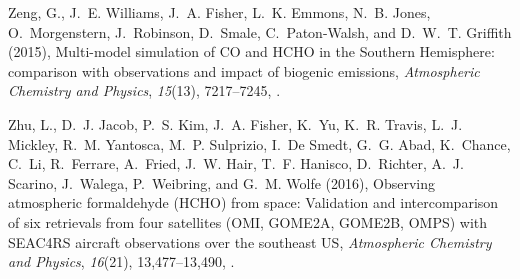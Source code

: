 \documentclass[draft]{agujournal}
\begin{document}
\begin{thebibliography}{19}
Zeng, G., J.~E. Williams, J.~A. Fisher, L.~K. Emmons, N.~B. Jones,
  O.~Morgenstern, J.~Robinson, D.~Smale, C.~Paton-Walsh, and D.~W.~T. Griffith
  (2015), {Multi-model simulation of CO and HCHO in the Southern Hemisphere:
  comparison with observations and impact of biogenic emissions},
  \textit{Atmospheric Chemistry and Physics}, \textit{15}(13), 7217--7245,
  .

Zhu, L., D.~J. Jacob, P.~S. Kim, J.~A. Fisher, K.~Yu, K.~R. Travis, L.~J.
  Mickley, R.~M. Yantosca, M.~P. Sulprizio, I.~{De Smedt}, G.~G. Abad,
  K.~Chance, C.~Li, R.~Ferrare, A.~Fried, J.~W. Hair, T.~F. Hanisco,
  D.~Richter, A.~J. Scarino, J.~Walega, P.~Weibring, and G.~M. Wolfe (2016),
  {Observing atmospheric formaldehyde (HCHO) from space: Validation and
  intercomparison of six retrievals from four satellites (OMI, GOME2A, GOME2B,
  OMPS) with SEAC4RS aircraft observations over the southeast US},
  \textit{Atmospheric Chemistry and Physics}, \textit{16}(21), 13,477--13,490,
  .

\end{thebibliography}
\end{document}
